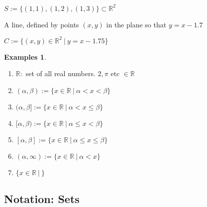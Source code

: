 \documentclass[twocolumn,20pt,fleqn]{extarticle}
\newcommand{\alert}[1]{{\color{red} #1}}
\newcommand{\sep}{\vspace{0.5cm}}
\theoremstyle{plain}
\theoremstyle{definition}
\newtheorem*{exmpls}{Examples}
\theoremstyle{remark}
\newenvironment*{examples}{\begin{exmpls} ~ \begin{enumerate}}{\end{enumerate}\end{exmpls}}
\begin{document}
\newpage

 $ S:= \{(1,1), (1,2), (1,3)\}  \subset \mathbb{R}^2 $  
\sep


















A line, defined by  \alert{points $(x,y)$} \alert{in the plane}  \alert{so that} \alert{$y = x - 1.7$} 


$ C:= \{(x,y) \in \mathbb{R}^2 \ |\ y = x - 1.75 \}$
 

\sep

\begin{examples}
\item $\mathbb{R}:$ set of all real numbers. $2, \pi \textrm{ etc } \in \mathbb{R}$
  \item $ (\alpha,  \beta) := \{x \in \mathbb{R} \ |\  \alpha < x  < \beta \}$
  
  
  \item $ (\alpha,  \beta] := \{x \in \mathbb{R} \ |\  \alpha < x  \leq \beta \}$
  
  
  \item $ [\alpha,  \beta) := \{x \in \mathbb{R} \ |\  \alpha \leq x  < \beta \}$
  
  
  \item $ [\alpha,  \beta] := \{x \in \mathbb{R} \ |\  \alpha \leq x  \leq \beta \}$
  
  
  \item $ (\alpha,  \infty) := \{x \in \mathbb{R} \ |\  \alpha < x \}$
  
  
  \item $\{x \in \mathbb{R} \ |\ \}$\end{examples}



\clearpage


\subsection{Notation: Sets}


\end{document}
